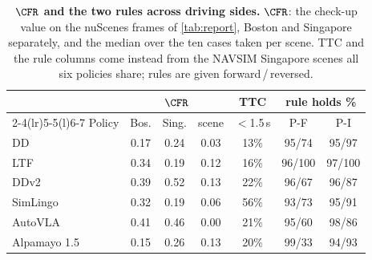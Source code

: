 \begin{table}[t]
\centering
\caption{\textbf{$\CFR$ and the two rules across driving sides.} $\CFR$: the check-up value on the nuScenes frames of \cref{tab:report}, Boston and Singapore separately, and the median over the ten cases taken per scene. TTC and the rule columns come instead from the \NumComN{} NAVSIM Singapore scenes all six policies share; rules are given forward\,/\,reversed.}
\label{tab:axes}
\scriptsize
\setlength{\tabcolsep}{2.5pt}
\begin{tabular}{@{}lcccccc@{}}
\toprule
 & \multicolumn{3}{c}{$\CFR$} & TTC & \multicolumn{2}{c}{rule holds \%} \\
\cmidrule(lr){2-4}\cmidrule(lr){5-5}\cmidrule(l){6-7}
Policy & Bos. & Sing. & scene & $<$1.5\,s & P-F & P-I \\
\midrule
DD & 0.17 & 0.24 & 0.03 & 13\% & 95/74 & 95/97 \\
LTF & 0.34 & 0.19 & 0.12 & 16\% & 96/100 & 97/100 \\
DDv2 & 0.39 & 0.52 & 0.13 & 22\% & 96/67 & 96/87 \\
SimLingo & 0.32 & 0.19 & 0.06 & 56\% & 93/73 & 95/91 \\
AutoVLA & 0.41 & 0.46 & 0.00 & 21\% & 95/60 & 98/86 \\
Alpamayo 1.5 & 0.15 & 0.26 & 0.13 & 20\% & 99/33 & 94/93 \\
\bottomrule
\end{tabular}
\end{table}
